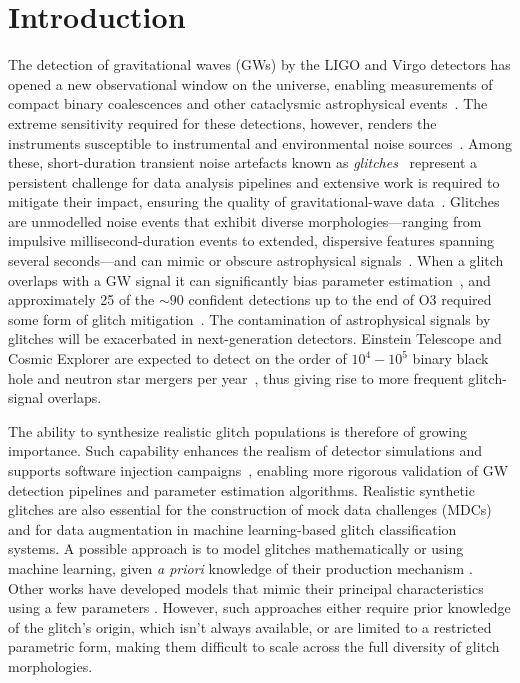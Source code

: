 \documentclass[reprint,nofootinbib,amsmath,amssymb,aps,floatfix]{revtex4-2}
\begin{document}
\section{Introduction}

The detection of gravitational waves (GWs) by the LIGO \cite{LIGO_paper} and Virgo \cite{VIRGOpaper} detectors has opened a new observational window on the universe, enabling measurements of compact binary coalescences and other cataclysmic astrophysical events~\cite{GWTC_3_catalog}.
The extreme sensitivity required for these detections, however, renders the instruments susceptible to instrumental and environmental noise sources~\cite{LIGO_O3_detector_characterization}.
Among these, short-duration transient noise artefacts known as \textit{glitches}~\cite{LIGO_second_third_detchar, Virgo_detchar_O3, Kagra_detchara} represent a persistent challenge for data analysis pipelines and extensive work is required to mitigate their impact, ensuring the quality of gravitational-wave data~\cite{davis2026rapiddataqualityinvestigations}.
Glitches are unmodelled noise events that exhibit diverse morphologies---ranging from impulsive millisecond-duration events to extended, dispersive features spanning several seconds---and can mimic or obscure astrophysical signals~\cite{abbott2018effects, blackburn2008lsc, abbott2016characterization}.
When a glitch overlaps with a GW signal it can significantly bias parameter estimation~\cite{pankow2018mitigation, PE_glitch_1, PE_glitch_2}, and approximately 25 of the $\sim\!90$ confident detections up to the end of O3 required some form of glitch mitigation~\cite{GWTC_3_catalog, pankow2018mitigation, BNS_1, BNS_2, BNS_BBH_2}.
The contamination of astrophysical signals by glitches will be exacerbated in next-generation detectors. Einstein Telescope \cite{ET_paper} and Cosmic Explorer \cite{Cosmic_expl} are expected to detect on the order of $10^4-10^5$ binary black hole and neutron star mergers per year~\cite{Iacovelli_2022, Kalogera_BNS}, thus giving rise to more frequent glitch-signal overlaps.


The ability to synthesize realistic glitch populations is therefore of growing importance.
Such capability enhances the realism of detector simulations and supports software injection campaigns~\cite{Abadie_2010_injection_1, Abadie_2010_injection_2, Virgo_detchar_O3}, enabling more rigorous validation of GW detection pipelines and parameter estimation algorithms.
Realistic synthetic glitches are also essential for the construction of mock data challenges (MDCs) and for data augmentation in machine learning-based glitch classification systems.
A possible approach is to model glitches mathematically or using machine learning, given \textit{a priori} knowledge of their production mechanism \cite{Tolley:2023umc, Chatterjee_2025}. 
Other works have developed models that mimic their principal characteristics using a few parameters \cite{Bondarescu:2023jcx}. 
However, such approaches either require prior knowledge of the glitch's origin, which isn't always available, or are limited to a restricted parametric form, making them difficult to scale across the full diversity of glitch morphologies.
\end{document}
